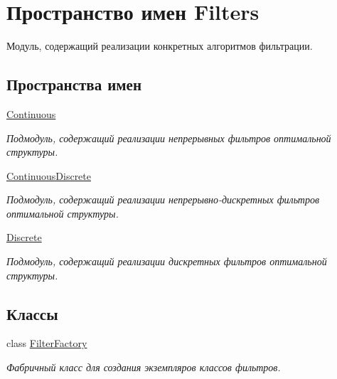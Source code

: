 \hypertarget{namespace_filters}{}\section{Пространство имен Filters}
\label{namespace_filters}


Модуль, содержащий реализации конкретных алгоритмов фильтрации.  


\subsection*{Пространства имен}
\begin{DoxyCompactItemize}
\item 
 \hyperlink{namespace_filters_1_1_continuous}{Continuous}
\begin{DoxyCompactList}\small\item\em Подмодуль, содержащий реализации непрерывных фильтров оптимальной структуры. \end{DoxyCompactList}\item 
 \hyperlink{namespace_filters_1_1_continuous_discrete}{Continuous\+Discrete}
\begin{DoxyCompactList}\small\item\em Подмодуль, содержащий реализации непрерывно-\/дискретных фильтров оптимальной структуры. \end{DoxyCompactList}\item 
 \hyperlink{namespace_filters_1_1_discrete}{Discrete}
\begin{DoxyCompactList}\small\item\em Подмодуль, содержащий реализации дискретных фильтров оптимальной структуры. \end{DoxyCompactList}\end{DoxyCompactItemize}
\subsection*{Классы}
\begin{DoxyCompactItemize}
\item 
class \hyperlink{class_filters_1_1_filter_factory}{Filter\+Factory}
\begin{DoxyCompactList}\small\item\em Фабричный класс для создания экземпляров классов фильтров. \end{DoxyCompactList}\end{DoxyCompactItemize}

